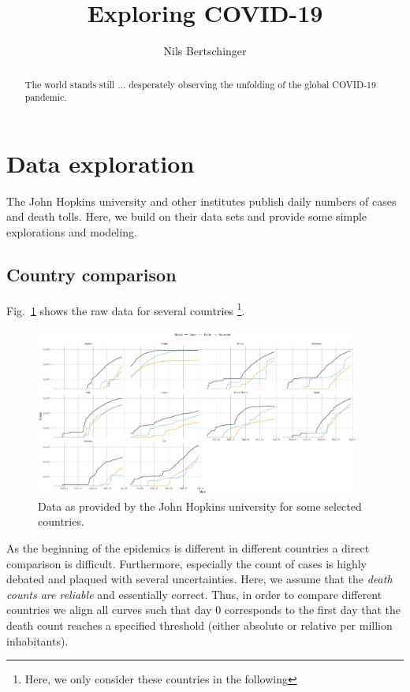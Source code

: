 \documentclass[a4paper]{tufte-handout}
\title{Exploring COVID-19}
\author{Nils Bertschinger}
\newcommand{\fig}[1]{Fig.~\ref{fig:#1}}
\renewcommand*{\thefootnote}{\fnsymbol{footnote}}
\begin{document}
\maketitle%

\renewcommand*{\thefootnote}{\Roman{footnote}}

\begin{abstract}
  The world stands still ... desperately observing the unfolding of
  the global COVID-19 pandemic.
\end{abstract}

\section{Data exploration}

The John Hopkins university and other institutes publish daily numbers
of cases and death tolls. Here, we build on their data sets and
provide some simple explorations and modeling.

\subsection{Country comparison}

\fig{rawdata} shows the raw data for several countries \footnote{Here,
  we only consider these countries in the following}.

\begin{figure}
  \begin{center}
    \includegraphics[width=0.95\textwidth]{../figs/raw_data.pdf}
  \end{center}
  \caption{\label{fig:rawdata}Data as provided by the John Hopkins
    university for some selected countries.}
\end{figure}

As the beginning of the epidemics is different in different countries
a direct comparison is difficult. Furthermore, especially the count of
cases is highly debated and plaqued with several uncertainties. Here,
we assume that the {\em death counts are reliable} and essentially
correct. Thus, in order to compare different countries we align all
curves such that day $0$ corresponds to the first day that the death
count reaches a specified threshold (either absolute or relative per
million inhabitants).
\end{document}

